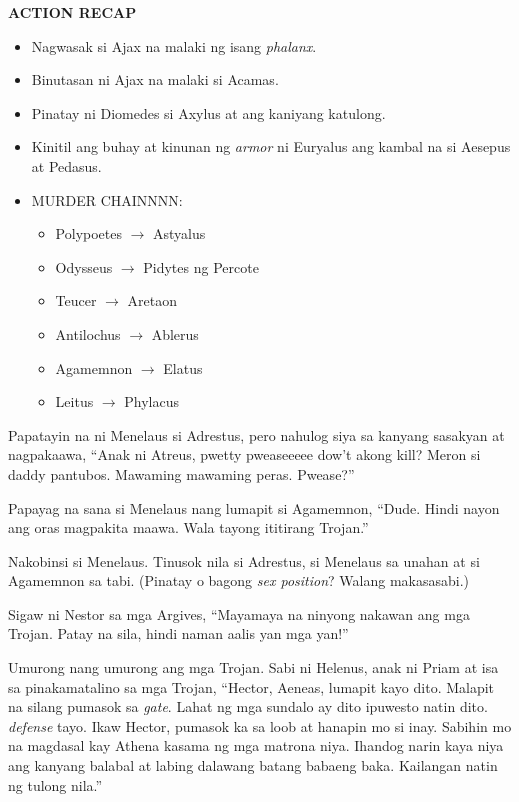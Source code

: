 \documentclass[12pt,letterpaper]{report}
\newenvironment{recap}{\begin{samepage}\begin{center}{\large\textbf{ACTION RECAP}}\begin{itemize}}{\end{itemize}\end{center}\end{samepage}}
\newcommand{\killchain}[2]{#1 $\rightarrow$ #2}
\begin{document}
\begin{recap}
    \item Nagwasak si Ajax na malaki ng isang \textit{phalanx}.
    \item Binutasan ni Ajax na malaki si Acamas.
    \item Pinatay ni Diomedes si Axylus at ang kaniyang katulong.
    \item Kinitil ang buhay at kinunan ng \textit{armor} ni Euryalus ang kambal na si Aesepus at Pedasus.
    \item MURDER CHAINNNN:
    \begin{itemize}
        \item \killchain{Polypoetes}{Astyalus}
        \item \killchain{Odysseus}{Pidytes ng Percote}
        \item \killchain{Teucer}{Aretaon}
        \item \killchain{Antilochus}{Ablerus}
        \item \killchain{Agamemnon}{Elatus}
        \item \killchain{Leitus}{Phylacus}
    \end{itemize}
\end{recap}

Papatayin na ni Menelaus si Adrestus, pero nahulog siya sa kanyang sasakyan at nagpakaawa, ``Anak ni Atreus, pwetty pweaseeeee dow't akong kill? Meron si daddy pantubos. Mawaming mawaming peras. Pwease?''

Papayag na sana si Menelaus nang lumapit si Agamemnon, ``Dude. Hindi nayon ang oras magpakita maawa. Wala tayong  ititirang Trojan.''

Nakobinsi si Menelaus. Tinusok nila si Adrestus, si Menelaus sa unahan at si Agamemnon sa tabi. (Pinatay o bagong \textit{sex position}? Walang makasasabi.)

Sigaw ni Nestor sa mga Argives, ``Mayamaya na ninyong nakawan ang mga Trojan. Patay na sila, hindi naman aalis yan mga yan!''

Umurong nang umurong ang mga Trojan. Sabi ni Helenus, anak ni Priam at isa sa pinakamatalino sa mga Trojan, ``Hector, Aeneas, lumapit kayo dito. Malapit na silang pumasok sa \textit{gate}. Lahat ng mga sundalo ay dito ipuwesto natin dito. \textit{defense} tayo. Ikaw Hector, pumasok ka sa loob at hanapin mo si inay. Sabihin mo na magdasal kay Athena kasama ng mga matrona niya. Ihandog narin kaya niya ang kanyang balabal at labing dalawang batang babaeng baka. Kailangan natin ng tulong nila.''
\end{document}
